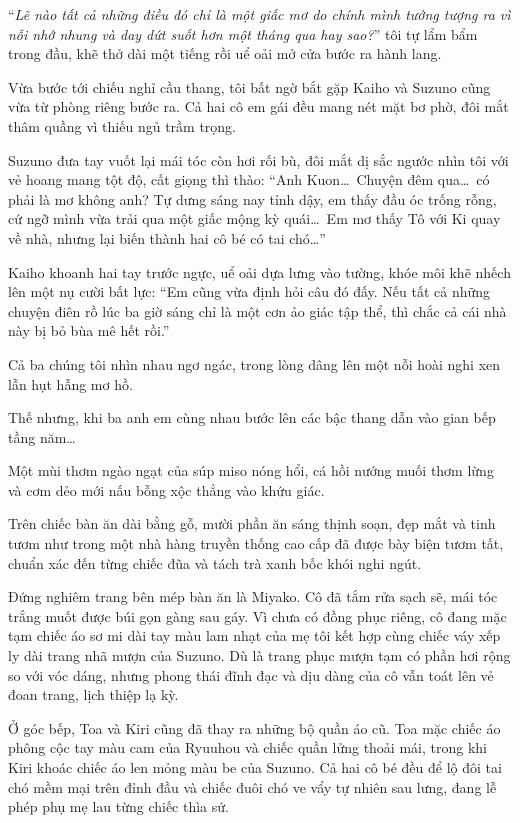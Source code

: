 \documentclass[../main.tex]{subfiles}
\begin{document}
``\textit{Lẽ nào tất cả những điều đó chỉ là một giấc mơ do chính mình tưởng tượng ra vì nỗi nhớ nhung và day dứt suốt hơn một tháng qua hay sao?}'' tôi tự lẩm bẩm trong đầu, khẽ thở dài một tiếng rồi uể oải mở cửa bước ra hành lang.

Vừa bước tới chiếu nghỉ cầu thang, tôi bất ngờ bắt gặp Kaiho và Suzuno cũng vừa từ phòng riêng bước ra. Cả hai cô em gái đều mang nét mặt bơ phờ, đôi mắt thâm quầng vì thiếu ngủ trầm trọng.

Suzuno đưa tay vuốt lại mái tóc còn hơi rối bù, đôi mắt dị sắc ngước nhìn tôi với vẻ hoang mang tột độ, cất giọng thì thào: ``Anh Kuon\dots\ Chuyện đêm qua\dots\ có phải là mơ không anh? Tự dưng sáng nay tỉnh dậy, em thấy đầu óc trống rỗng, cứ ngỡ mình vừa trải qua một giấc mộng kỳ quái\dots\ Em mơ thấy Tô với Ki quay về nhà, nhưng lại biến thành hai cô bé có tai chó\dots''

Kaiho khoanh hai tay trước ngực, uể oải dựa lưng vào tường, khóe môi khẽ nhếch lên một nụ cười bất lực: ``Em cũng vừa định hỏi câu đó đấy. Nếu tất cả những chuyện điên rồ lúc ba giờ sáng chỉ là một cơn ảo giác tập thể, thì chắc cả cái nhà này bị bỏ bùa mê hết rồi.''

Cả ba chúng tôi nhìn nhau ngơ ngác, trong lòng dâng lên một nỗi hoài nghi xen lẫn hụt hẫng mơ hồ.

Thế nhưng, khi ba anh em cùng nhau bước lên các bậc thang dẫn vào gian bếp tầng năm\dots

Một mùi thơm ngào ngạt của súp miso nóng hổi, cá hồi nướng muối thơm lừng và cơm dẻo mới nấu bỗng xộc thẳng vào khứu giác.

Trên chiếc bàn ăn dài bằng gỗ, mười phần ăn sáng thịnh soạn, đẹp mắt và tinh tươm như trong một nhà hàng truyền thống cao cấp đã được bày biện tươm tất, chuẩn xác đến từng chiếc đũa và tách trà xanh bốc khói nghi ngút.

Đứng nghiêm trang bên mép bàn ăn là Miyako. Cô đã tắm rửa sạch sẽ, mái tóc trắng muốt được búi gọn gàng sau gáy. Vì chưa có đồng phục riêng, cô đang mặc tạm chiếc áo sơ mi dài tay màu lam nhạt của mẹ tôi kết hợp cùng chiếc váy xếp ly dài trang nhã mượn của Suzuno. Dù là trang phục mượn tạm có phần hơi rộng so với vóc dáng, nhưng phong thái đĩnh đạc và dịu dàng của cô vẫn toát lên vẻ đoan trang, lịch thiệp lạ kỳ.

Ở góc bếp, Toa và Kiri cũng đã thay ra những bộ quần áo cũ. Toa mặc chiếc áo phông cộc tay màu cam của Ryuuhou và chiếc quần lửng thoải mái, trong khi Kiri khoác chiếc áo len mỏng màu be của Suzuno. Cả hai cô bé đều để lộ đôi tai chó mềm mại trên đỉnh đầu và chiếc đuôi chó ve vẩy tự nhiên sau lưng, đang lễ phép phụ mẹ lau từng chiếc thìa sứ.
\end{document}

